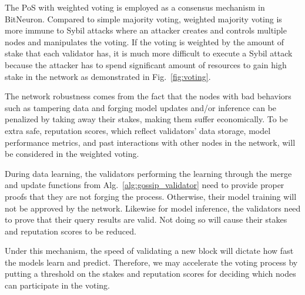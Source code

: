 \documentclass[11pt,letterpaper]{article}
\begin{document}
The PoS with weighted voting is employed as a consensus mechanism in BitNeuron. Compared to simple majority voting, weighted majority voting is more immune to Sybil attacks where an attacker creates and controls multiple nodes and manipulates the voting. If the voting is weighted by the amount of stake that each validator has, it is much more difficult to execute a Sybil attack because the attacker has to spend significant amount of resources to gain high stake in the network as demonstrated in Fig.~\ref{fig:voting}.

The network robustness comes from the fact that the nodes with bad behaviors such as tampering data and forging model updates and/or inference can be penalized by taking away their stakes, making them suffer economically. To be extra safe, reputation scores, which reflect validators' data storage, model performance metrics, and past interactions with other nodes in the network, will be considered in the weighted voting.

During data learning, the validators performing the learning through the merge and update functions from Alg.~\ref{alg:gossip_validator} need to provide proper proofs that they are not forging the process. Otherwise, their model training will not be approved by the network. Likewise for model inference, the validators need to prove that their query results are valid. Not doing so will cause their stakes and reputation scores to be reduced.

Under this mechanism, the speed of validating a new block will dictate how fast the models learn and predict. Therefore, we may accelerate the voting process by putting a threshold on the stakes and reputation scores for deciding which nodes can participate in the voting.
\end{document}
